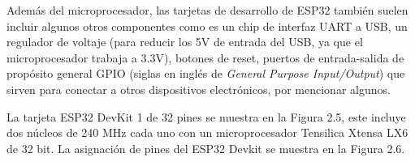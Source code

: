 Además del microprocesador, las tarjetas de desarrollo de ESP32 también suelen incluir algunos otros componentes como es un chip de interfaz UART a USB, un regulador de voltaje (para reducir los 5V de entrada del USB, ya que el microprocesador trabaja a 3.3V), botones de reset, puertos de entrada-salida de propósito general GPIO (siglas en inglés de \textit{General Purpose Input/Output}) que sirven para conectar a otros dispositivos electrónicos, por mencionar algunos. 

\vspace{0.5cm}

La tarjeta ESP32 DevKit 1 de 32 pines se muestra en la Figura 2.5, este incluye dos núcleos de 240 MHz cada uno con un microprocesador Tensilica Xtensa LX6 de 32 bit. La asignación de pines del ESP32 Devkit se muestra en la Figura 2.6.

